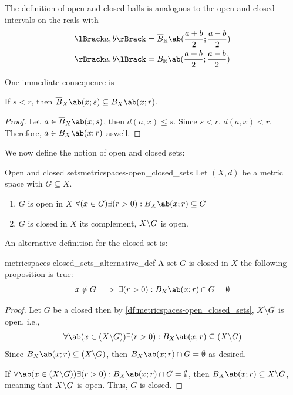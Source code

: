 The definition of open and closed balls is analogous to the open and closed
intervals on the reals with
\begin{align}
  \lBrack a, b \rBrack & = \cball{\mathbb{R}}{\frac{a + b}{2}}{\frac{a - b}{2}} \\
  \rBrack a, b \lBrack & = \oball{\mathbb{R}}{\frac{a + b}{2}}{\frac{a - b}{2}}
\end{align}

One immediate consequence is
\begin{cor}{}{}
  If \(s < r\), then \(\cball{X}{x}{s} \subseteq \oball{X}{x}{r}\).
\end{cor}

\begin{proof}
  Let \(a \in \cball{X}{x}{s}\), then \(d(a, x) \leq s\). Since \(s < r\), \(d(a, x) < r\).
  Therefore, \(a \in \oball{X}{x}{r}\) aswell.
\end{proof}

We now define the notion of open and closed sets:

\begin{df}{Open and closed sets}{metricspaces-open_closed_sets}
  Let \((X, d)\) be a metric space with \(G \subseteq X\).
   

  \begin{enumerate}[noitemsep]
    \item \(G\) is open in \(X\) \ifft
          \(\forall (x \in G) \exists (r > 0) : \oball{X}{x}{r} \subseteq G\)
    \item \(G\) is closed in \(X\) \ifft its complement, \(X \backslash G\) is open.
  \end{enumerate}
\end{df}

An alternative definition for the closed set is:
\begin{cor}{}{metricspaces-closed_sets_alternative_def}
  A set \(G\) is closed in \(X\) \ifft the following proposition is true:
  \begin{equation}
    x \notin G \implies \exists (r > 0) : \oball{X}{x}{r} \cap G = \emptyset
  \end{equation}
\end{cor}
\begin{proof}
  \forwarddir Let \(G\) be a closed then by \cref{df:metricspaces-open_closed_sets},
  \(X \backslash G\) is open, i.e.,
  \begin{equation}
    \forall \ab(x \in (X \smin G)) \exists (r > 0) : \oball{X}{x}{r} \subseteq (X \smin G)
  \end{equation}
  Since \(\oball{X}{x}{r} \subseteq (X \smin G)\), then \(\oball{X}{x}{r} \cap G = \emptyset\)
  as desired.

  \backwarddir If
  \(\forall \ab(x \in (X \smin G)) \exists (r > 0) : \oball{X}{x}{r} \cap G = \emptyset\),
  then \(\oball{X}{x}{r} \subseteq X \smin G\), meaning that \(X \backslash G\) is open.
  Thus, \(G\) is closed.
\end{proof}

